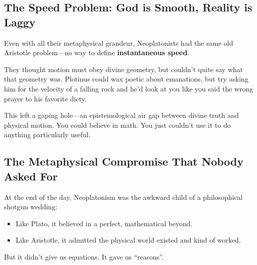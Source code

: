 \subsection{The Speed Problem: God is Smooth, Reality is Laggy}

Even with all their metaphysical grandeur, Neoplatonists had the same old Aristotle problem—no way to define \textbf{instantaneous speed}.

They thought motion must obey divine geometry, but couldn't quite say what that geometry was. Plotinus could wax poetic about emanations, but try asking him for the velocity of a falling rock and he’d look at you like you said the wrong prayer to his favorite diety.

This left a gaping hole—an epistemological air gap between divine truth and physical motion. You could believe in math. You just couldn’t use it to do anything particularly useful.

\subsection{The Metaphysical Compromise That Nobody Asked For}

At the end of the day, Neoplatonism was the awkward child of a philosophical shotgun wedding:

\begin{itemize}
    \item Like Plato, it believed in a perfect, mathematical beyond.
    \item Like Aristotle, it admitted the physical world existed and kind of worked.
\end{itemize}

But it didn’t give us equations. It gave us ``reasons''.

